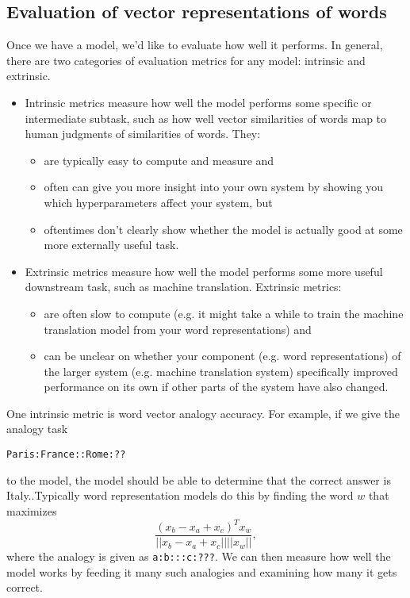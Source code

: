 \subsection{Evaluation of vector representations of words}
Once we have a model, we'd like to evaluate how well it performs. In general, there are two categories of evaluation metrics for any model: intrinsic and extrinsic.
\begin{itemize}
\item Intrinsic metrics measure how well the model performs some specific or intermediate subtask, such as how well vector similarities of words map to human judgments of similarities of words. They:
\begin{itemize}
\item are typically easy to compute and measure and
\item often can give you more insight into your own system by showing you which hyperparameters affect your system, but
\item oftentimes don't clearly show whether the model is actually good at some more externally useful task.
\end{itemize}
\item Extrinsic metrics measure how well the model performs some more useful downstream task, such as machine translation. Extrinsic metrics:
\begin{itemize}
\item are often slow to compute (e.g. it might take a while to train the machine translation model from your word representations) and
\item can be unclear on whether your component (e.g. word representations) of the larger system (e.g. machine translation system) specifically improved performance on its own if other parts of the system have also changed.
\end{itemize}
\end{itemize}
One intrinsic metric is word vector analogy accuracy. For example, if we give the analogy task\\
\centerline{\texttt{Paris:France::Rome:??}}
to the model, the model should be able to determine that the correct answer is Italy..Typically word representation models do this by finding the word $w$ that maximizes
$$\frac{(x_b - x_a + x_c)^T x_w}{||x_b - x_a + x_c||||x_w||},$$
where the analogy is given as \texttt{a:b:::c:???}. We can then measure how well the model works by feeding it many such analogies and examining how many it gets correct.
